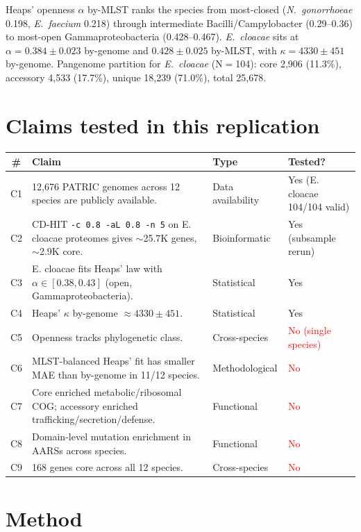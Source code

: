 \documentclass[11pt,a4paper]{article}
\begin{document}
Heaps' openness $\alpha$ by-MLST ranks the species from most-closed (\textit{N.\ gonorrhoeae} 0.198, \textit{E.\ faecium} 0.218) through intermediate Bacilli/Campylobacter (0.29--0.36) to most-open Gammaproteobacteria (0.428--0.467). \textit{E.\ cloacae} sits at $\alpha = 0.384 \pm 0.023$ by-genome and $0.428 \pm 0.025$ by-MLST, with $\kappa = 4330 \pm 451$ by-genome. Pangenome partition for \textit{E.\ cloacae} (N$=$104): core 2{,}906 (11.3\%), accessory 4{,}533 (17.7\%), unique 18{,}239 (71.0\%), total 25{,}678.

\section{Claims tested in this replication}

\begin{longtable}{c p{7.8cm} l l}
\toprule
\# & Claim & Type & Tested? \\
\midrule
C1 & 12{,}676 PATRIC genomes across 12 species are publicly available. & Data availability & \textcolor{green!60!black}{Yes (E. cloacae 104/104 valid)} \\
C2 & CD-HIT \texttt{-c 0.8 -aL 0.8 -n 5} on E. cloacae proteomes gives $\sim$25.7K genes, $\sim$2.9K core. & Bioinformatic & \textcolor{green!60!black}{Yes (subsample rerun)} \\
C3 & E. cloacae fits Heaps' law with $\alpha \in [0.38, 0.43]$ (open, Gammaproteobacteria). & Statistical & \textcolor{green!60!black}{Yes} \\
C4 & Heaps' $\kappa$ by-genome $\approx 4330 \pm 451$. & Statistical & \textcolor{green!60!black}{Yes} \\
C5 & Openness tracks phylogenetic class. & Cross-species & \textcolor{red}{No (single species)} \\
C6 & MLST-balanced Heaps' fit has smaller MAE than by-genome in 11/12 species. & Methodological & \textcolor{red}{No} \\
C7 & Core enriched metabolic/ribosomal COG; accessory enriched trafficking/secretion/defense. & Functional & \textcolor{red}{No} \\
C8 & Domain-level mutation enrichment in AARSs across species. & Functional & \textcolor{red}{No} \\
C9 & 168 genes core across all 12 species. & Cross-species & \textcolor{red}{No} \\
\bottomrule
\end{longtable}

\section{Method}
\end{document}
